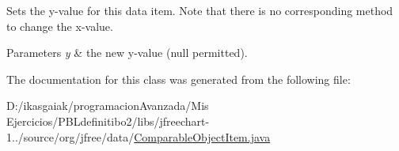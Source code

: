 Sets the y-\/value for this data item. Note that there is no corresponding method to change the x-\/value.


\begin{DoxyParams}{Parameters}
{\em y} & the new y-\/value ({\ttfamily null} permitted). \\
\hline
\end{DoxyParams}


The documentation for this class was generated from the following file\+:\begin{DoxyCompactItemize}
\item 
D\+:/ikasgaiak/programacion\+Avanzada/\+Mis Ejercicios/\+P\+B\+Ldefinitibo2/libs/jfreechart-\/1../source/org/jfree/data/\mbox{\hyperlink{_comparable_object_item_8java}{Comparable\+Object\+Item.\+java}}\end{DoxyCompactItemize}
